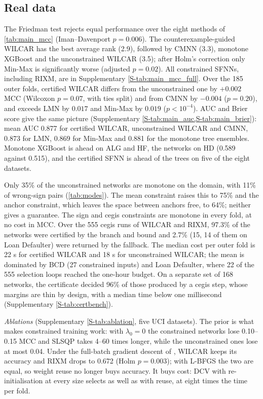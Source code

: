\documentclass[preprint,12pt,authoryear]{elsarticle}
\begin{document}
\subsection{Real data}\label{sec:perf}
The Friedman test rejects equal performance over the eight methods of \cref{tab:main_mcc} (Iman--Davenport
$p=0.006$). The counterexample-guided WILCAR has the best average rank (2.9), followed by CMNN (3.3), monotone XGBoost
and the unconstrained WILCAR (3.5); after Holm's correction only Min-Max is significantly worse (adjusted $p=0.02$).
All constrained SFNNs, including RIXM, are in Supplementary \cref{S-tab:main_mcc_full}. Over the 185 outer folds,
certified WILCAR differs from the unconstrained one by $+0.002$ MCC (Wilcoxon $p=0.07$, with ties split) and from CMNN by $-0.004$
($p=0.20$), and exceeds LMN by $0.017$ and Min-Max by $0.019$ ($p<10^{-4}$). AUC and Brier score give the same
picture (Supplementary \cref{S-tab:main_auc,S-tab:main_brier}): mean AUC 0.877 for certified WILCAR, unconstrained WILCAR
and CMNN, 0.873 for LMN, 0.869 for Min-Max and 0.881 for the monotone tree ensembles. Monotone XGBoost is ahead on ALG and HF, the networks on HD (0.589 against 0.515), and the
certified SFNN is ahead of the trees on five of the eight datasets.

Only 35\% of the unconstrained networks are monotone on the domain, with 11\% of wrong-sign pairs (\cref{tab:modes}).
The mean constraint raises this to 75\% and the anchor constraint, which leaves the space between anchors free, to
64\%; neither gives a guarantee. The sign and cegis constraints are monotone in every fold, at no cost in MCC. Over the 555 cegis runs of WILCAR and RIXM, 97.3\% of the networks were certified by the branch and bound and 2.7\%
(15, 14 of them on Loan Defaulter) were returned by the fallback.
The median cost per outer fold is 22 s for certified WILCAR and 18 s for unconstrained WILCAR; the mean is dominated by BCD
(27 constrained inputs) and Loan Defaulter, where 22 of the 555 selection loops reached the one-hour budget. On a separate
set of 168 networks, the certificate decided 96\% of those produced by a cegis step, whose margins are thin by design,
with a median time below one millisecond (Supplementary \cref{S-tab:certbench}).

\emph{Ablations} (Supplementary \cref{S-tab:ablation}, five UCI datasets). The prior is what makes constrained training
work: with $\lambda_0=0$ the constrained networks lose 0.10--0.15 MCC and SLSQP takes 4--60 times longer, while the
unconstrained ones lose at most 0.04. Under the full-batch gradient descent of \citet{Sa2022}, WILCAR keeps its accuracy and
RIXM drops to 0.672 (Holm $p=0.003$); with L-BFGS the two are equal, so weight reuse no longer buys accuracy. It buys
cost: DCV with re-initialisation at every size selects as well as with reuse, at eight times the time per fold.
\end{document}
